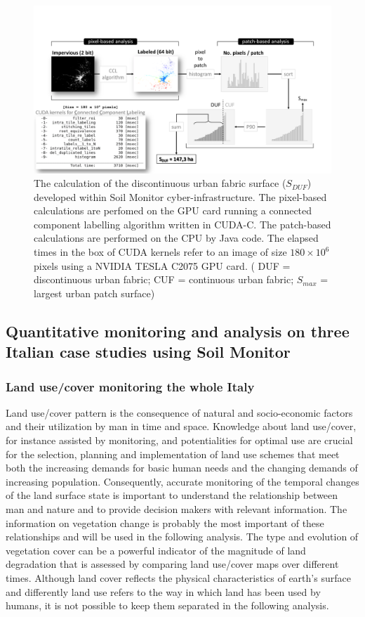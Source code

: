 \documentclass[APA,LATO1COL,doublespace]{WileyNJD-v2}
\begin{document}
\begin{figure}[t] %
    \centerline{\includegraphics[width=500pt]{03_DUF_explanation}}
    \caption{ The calculation of the discontinuous urban fabric surface ($S_{DUF}$) developed within Soil Monitor cyber-infrastructure. 
    The pixel-based calculations are perfomed on the GPU card running a connected component labelling algorithm written in CUDA-C. 
    The patch-based calculations are performed on the CPU by Java code.
    The elapsed times in the box of CUDA kernels refer to an image of size $180 \times 10^6$ pixels using a NVIDIA TESLA C2075 GPU card.
    ( DUF = discontinuous urban fabric; CUF = continuous urban fabric; $S_{max}$ = largest urban patch surface)} \label{fig:ccl}
\end{figure}


\subsection{Quantitative monitoring and analysis on three Italian case studies using Soil Monitor}
\label{sec:caseStudies}

\subsubsection{ Land use/cover monitoring the whole Italy } \label{sec:caseIT}
Land use/cover pattern is the consequence of natural and socio-economic factors and their utilization by man in time and space.
Knowledge about land use/cover, for instance assisted by monitoring, and potentialities for optimal use are crucial for the selection, planning and implementation of land use schemes that meet both the increasing demands for basic human needs and %
the changing demands of increasing population.
Consequently, accurate monitoring of the temporal changes of the land surface state is important to understand the relationship between man and nature and to provide decision makers with relevant information.
The information on vegetation change is probably the most important of these relationships and will be used in the following analysis.
The type and evolution of vegetation cover can be a powerful indicator of the magnitude of land degradation that is assessed by comparing land use/cover maps over different times.
Although land cover reflects the physical characteristics of earth's surface and differently land use refers to the way in which land has been used by humans, it is not possible to keep them separated in the following analysis.
\end{document}
